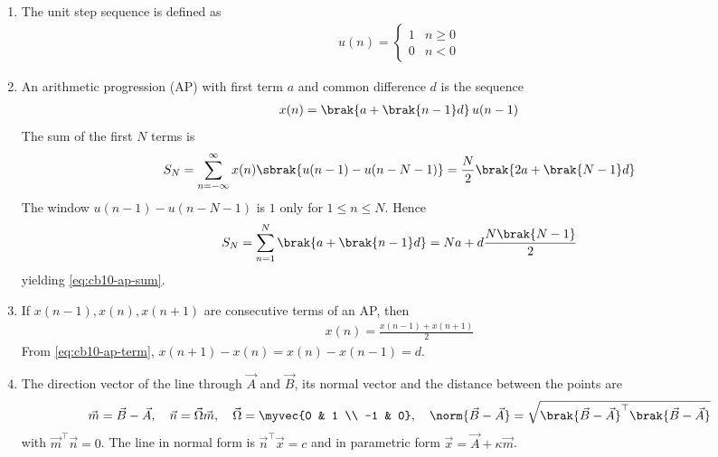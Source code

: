 \begin{enumerate}[label=\thesubsection.\arabic*, ref=\thesubsection.\theenumi,itemsep=0pt]

\item The unit step sequence is defined as
\begin{align}
u(n) = \begin{cases} 1 & n \ge 0 \\ 0 & n < 0 \end{cases}
\label{eq:cb10-step}
\end{align}

\item An arithmetic progression (AP) with first term $a$ and common difference $d$ is the sequence
\begin{align}
x(n) = \brak{a + \brak{n-1}d}\, u(n-1)
\label{eq:cb10-ap-term}
\end{align}
The sum of the first $N$ terms is
\begin{align}
S_N = \sum_{n=-\infty}^{\infty} x(n)\sbrak{u(n-1) - u(n-N-1)} = \frac{N}{2}\brak{2a + \brak{N-1}d}
\label{eq:cb10-ap-sum}
\end{align}
\solution The window $u(n-1) - u(n-N-1)$ is $1$ only for $1 \le n \le N$. Hence
\begin{align}
S_N = \sum_{n=1}^{N}\brak{a + \brak{n-1}d} = Na + d\frac{N\brak{N-1}}{2}
\end{align}
yielding \eqref{eq:cb10-ap-sum}.

\item If $x(n-1), x(n), x(n+1)$ are consecutive terms of an AP, then
\begin{align}
x(n) = \frac{x(n-1) + x(n+1)}{2}
\label{eq:cb10-ap-mid}
\end{align}
\solution From \eqref{eq:cb10-ap-term}, $x(n+1) - x(n) = x(n) - x(n-1) = d$.

\item The direction vector of the line through $\vec{A}$ and $\vec{B}$, its normal vector and the distance between the points are
\begin{align}
\vec{m} = \vec{B} - \vec{A}, \quad \vec{n} = \vec{\Omega}\vec{m}, \quad \vec{\Omega} = \myvec{0 & 1 \\ -1 & 0}, \quad \norm{\vec{B}-\vec{A}} = \sqrt{\brak{\vec{B}-\vec{A}}^{\top}\brak{\vec{B}-\vec{A}}}
\label{eq:cb10-dir-norm}
\end{align}
with $\vec{m}^{\top}\vec{n} = 0$. The line in normal form is $\vec{n}^{\top}\vec{x} = c$ and in parametric form $\vec{x} = \vec{A} + \kappa\vec{m}$.


\end{enumerate}
